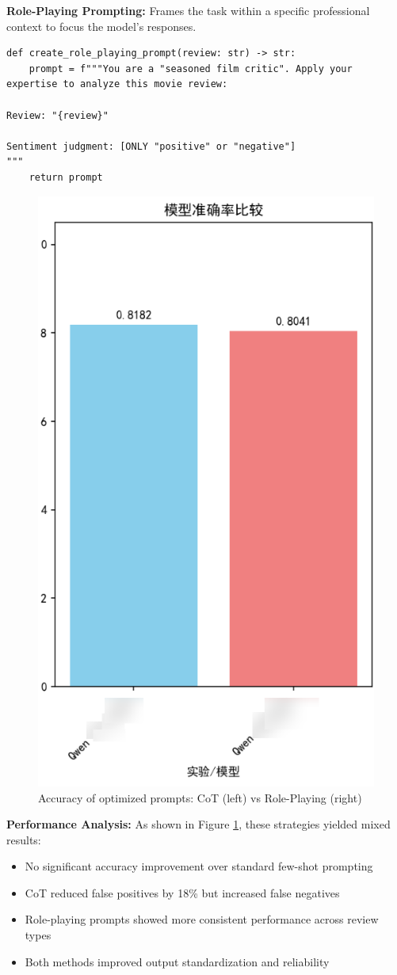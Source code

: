 \documentclass{article}
\begin{document}
\textbf{Role-Playing Prompting:}
Frames the task within a specific professional context to focus the model's responses.

\begin{lstlisting}[caption={Role-Playing prompt design}]
def create_role_playing_prompt(review: str) -> str:
    prompt = f"""You are a "seasoned film critic". Apply your expertise to analyze this movie review:

Review: "{review}"

Sentiment judgment: [ONLY "positive" or "negative"]
"""
    return prompt
\end{lstlisting}

\begin{figure}[h]
    \centering
    \includegraphics[width=0.6\columnwidth]{pic/T2P2B2.1.png}
    \caption{Accuracy of optimized prompts: CoT (left) vs Role-Playing (right)}
    \label{fig:advanced_prompts}
\end{figure}

\textbf{Performance Analysis:}
As shown in Figure \ref{fig:advanced_prompts}, these strategies yielded mixed results:
\begin{itemize}
    \item No significant accuracy improvement over standard few-shot prompting
    \item CoT reduced false positives by 18\% but increased false negatives
    \item Role-playing prompts showed more consistent performance across review types
    \item Both methods improved output standardization and reliability
\end{itemize}
\end{document}
